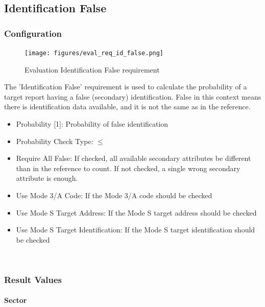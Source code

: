 \subsection{Identification False}
\label{sec:eval_req_id_false} 

\subsubsection{Configuration}

\begin{figure}[H]
    \texttt{[image: figures/eval\_req\_id\_false.png]}
  \caption{Evaluation Identification False requirement}
\end{figure}

The 'Identification False' requirement is used to calculate the probability of a target report having a false (secondary) identification. False in this context means there is identification data available, and it is not the same as in the reference. \\

\begin{itemize}  
\item Probability [1]: Probability of false identification
\item Probability Check Type: $\leq$
\item Require All False: If checked, all available secondary attributes be different than in the reference to count. If not checked, a single wrong secondary attribute is enough.
\item Use Mode 3/A Code: If the Mode 3/A code should be checked
\item Use Mode S Target Address: If the Mode S target address should be checked
\item Use Mode S Target Identification: If the Mode S target identification should be checked
\end{itemize}
\ \\

\subsubsection{Result Values}

\paragraph{Sector}

